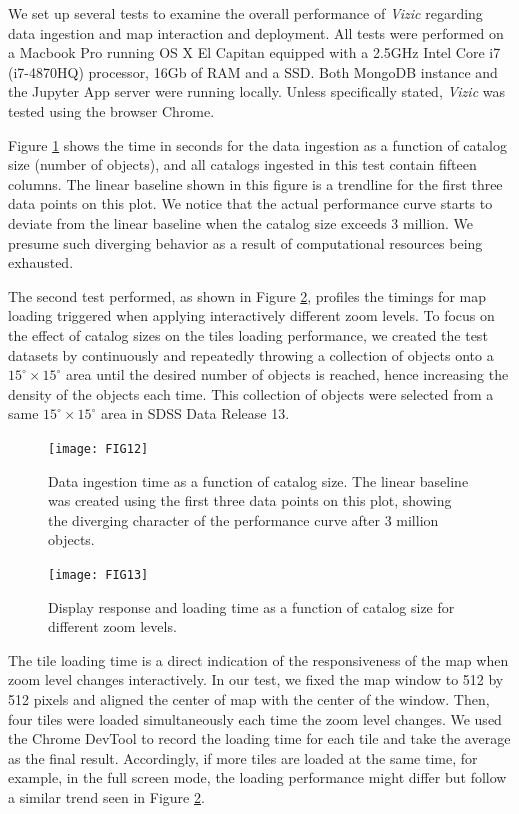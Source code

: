 \documentclass[5p,authoryear]{elsarticle}
\begin{document}
We set up several tests to examine the overall performance of \textit{Vizic} regarding data ingestion and map interaction and deployment. All tests were performed on a Macbook Pro running OS X El Capitan equipped with a 2.5GHz Intel Core i7 (i7-4870HQ) processor, 16Gb of RAM and a SSD.
Both MongoDB instance and the Jupyter App server were running locally. Unless specifically stated, \textit{Vizic} was tested using the browser Chrome.

Figure \ref{fig:ingest} shows the time in seconds for the data ingestion as a function of catalog size (number of objects), and all catalogs ingested in this test contain fifteen columns. The linear baseline shown in this figure is a trendline for the first three data points on this plot. We notice that the actual performance curve starts to deviate from the linear baseline when the catalog size exceeds 3 million. We presume such diverging behavior as a result of computational resources being exhausted.

The second test performed, as shown in Figure \ref{fig:load}, profiles the timings for map loading triggered when applying interactively different zoom levels.
To focus on the effect of catalog sizes on the tiles loading performance, we created the test datasets by continuously and repeatedly throwing a collection of objects onto a $15^\circ \times 15^\circ$ area until the desired number of objects is reached, hence increasing the density of the objects each time.
This collection of objects were selected from a same $15^\circ \times 15^\circ$ area in SDSS Data Release 13.

\begin{figure}[h]
  \centering
  \texttt{[image: FIG12]}
  \caption{Data ingestion time as a function of catalog size. The linear baseline was created using the first three data points on this plot, showing the diverging character of the performance curve after 3 million objects.}
  \label{fig:ingest}
\end{figure}

\begin{figure}[h]
  \centering
  \texttt{[image: FIG13]}
  \caption{Display response and loading time as a function of catalog size for different zoom levels.}
  \label{fig:load}
\end{figure}

The tile loading time is a direct indication of the responsiveness of the map when zoom level changes interactively.
In our test, we fixed the map window to 512 by 512 pixels and aligned the center of map with the center of the window. Then, four tiles were loaded simultaneously each time the zoom level changes. We used the Chrome DevTool to record the loading time for each tile and take the average as the final result.
Accordingly, if more tiles are loaded at the same time, for example, in the full screen mode, the loading performance might differ but follow a similar trend seen in Figure \ref{fig:load}.
\end{document}
